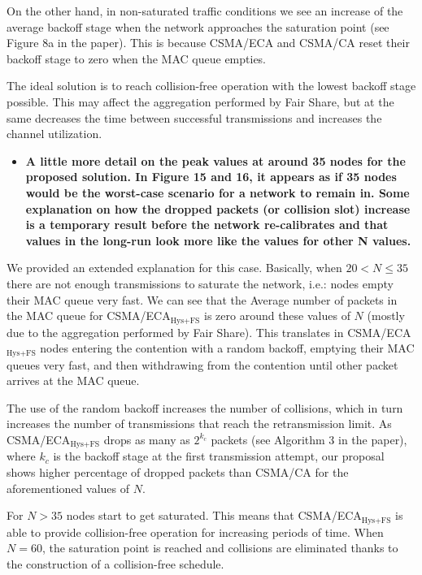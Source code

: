 \documentclass[]{article}
\begin{document}
		On the other hand, in non-saturated traffic conditions we see an increase of the average backoff stage when the network approaches the saturation point (see Figure 8a in the paper). This is because CSMA/ECA and CSMA/CA reset their backoff stage to zero when the MAC queue empties.
		
		The ideal solution is to reach collision-free operation with the lowest backoff stage possible. This may affect the aggregation performed by Fair Share, but at the same decreases the time between successful transmissions and increases the channel utilization.
		
		\begin{itemize}
			\item {\bf A little more detail on the peak values at around 35 nodes for the proposed solution. In Figure 15 and 16, it appears as if 35 nodes would be the worst-case scenario for a network to remain in. Some explanation on how the dropped packets (or collision slot) increase is a temporary result before the network re-calibrates and that values in the long-run look more like the values for other N values.}
		\end{itemize}
		
		We provided an extended explanation for this case. Basically, when $20 < N \leq 35$ there are not enough transmissions to saturate the network, i.e.: nodes empty their MAC queue very fast. We can see that the Average number of packets in the MAC queue for CSMA/ECA$_{\text{Hys+FS}}$ is zero around these values of $N$ (mostly due to the aggregation performed by Fair Share). This translates in CSMA/ECA$_{\text{Hys+FS}}$ nodes entering the contention with a random backoff, emptying their MAC queues very fast, and then withdrawing from the contention until other packet arrives at the MAC queue. 
		
		The use of the random backoff increases the number of collisions, which in turn increases the number of transmissions that reach the retransmission limit. As CSMA/ECA$_{\text{Hys+FS}}$ drops as many as $2^{k_{c}}$ packets (see Algorithm 3 in the paper), where $k_{c}$ is the backoff stage at the first transmission attempt, our proposal shows higher percentage of dropped packets than CSMA/CA for the aforementioned values of $N$.
		
		For $N>35$ nodes start to get saturated. This means that CSMA/ECA$_{\text{Hys+FS}}$ is able to provide collision-free operation for increasing periods of time. When $N=60$, the saturation point is reached and collisions are eliminated thanks to the construction of a collision-free schedule.
		
\end{document}
